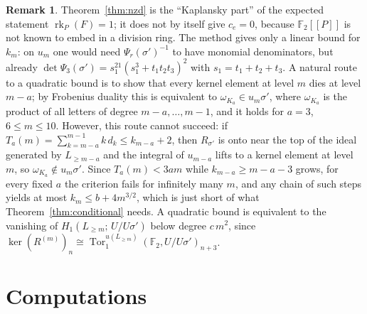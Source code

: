 \documentclass[11pt]{amsart}
\theoremstyle{definition}
\newtheorem{remark}[theorem]{Remark}
\newcommand{\F}{\mathbb{F}}
\newcommand{\rk}{\operatorname{rk}}
\begin{document}
\begin{remark}\label{rem:route}
Theorem~\ref{thm:nzd} is the ``Kaplansky part'' of the expected statement $\rk_P(F)=1$; it does not by itself give
$c_e=0$, because $\F_2[[P]]$ is not known to embed in a division ring. The method gives only a linear bound for $k_m$:
on $u_m$ one would need $\Psi_r(\sigma')^{-1}$ to have monomial denominators, but already
$\det\Psi_3(\sigma')=s_1^{21}(s_1^3+t_1t_2t_3)^2$ with $s_1=t_1+t_2+t_3$.
A natural route to a quadratic bound is to show that every kernel element at level $m$ dies at level $m-a$; by
Frobenius duality this is equivalent to $\omega_{K_a}\in u_m\sigma'$, where $\omega_{K_a}$ is the product of all letters
of degree $m-a,\dots,m-1$, and it holds for $a=3$, $6\le m\le10$. However, this route cannot succeed: if
$T_a(m)=\sum_{k=m-a}^{m-1}k\,d_k\le k_{m-a}+2$, then $R_{\sigma'}$ is onto near the top of the ideal generated by $L_{\ge m-a}$
and the integral of $u_{m-a}$ lifts to a kernel element at level $m$, so $\omega_{K_a}\notin u_m\sigma'$. Since
$T_a(m)<3am$ while $k_{m-a}\ge m-a-3$ grows, for every fixed $a$ the criterion fails for infinitely many $m$, and any
chain of such steps yields at most $k_m\le b+4m^{3/2}$, which is just short of what Theorem~\ref{thm:conditional} needs.
A quadratic bound is equivalent to the vanishing of $H_1(L_{\ge m};\,U/U\sigma')$ below degree $c\,m^2$, since
$\ker(R^{(m)})_n\cong\operatorname{Tor}_1^{u(L_{\ge m})}(\F_2,U/U\sigma')_{n+3}$.
\end{remark}

\section{Computations}\label{sec:numerics}
\end{document}
